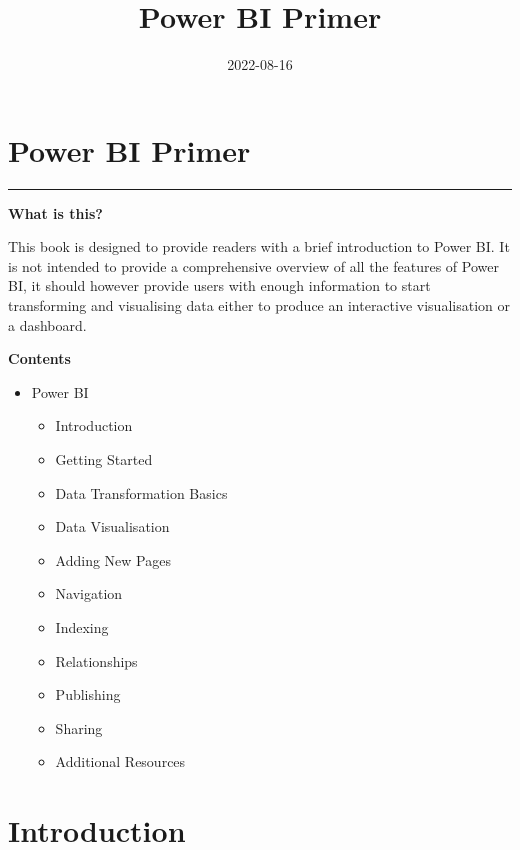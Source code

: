 \documentclass[
]{book}
\title{Power BI Primer}
\author{}
\date{\vspace{-2.5em}2022-08-16}
\providecommand{\tightlist}{%
  \setlength{\itemsep}{0pt}\setlength{\parskip}{0pt}}
\begin{document}
\maketitle

{
\setcounter{tocdepth}{1}
\tableofcontents
}
\hypertarget{Power-BI-Primer}{%
\chapter*{Power BI Primer}\label{Power-BI-Primer}}

\begin{center}\rule{0.5\linewidth}{0.5pt}\end{center}

\textbf{What is this?}

This book is designed to provide readers with a brief introduction to Power BI. It is not intended to provide a comprehensive overview of all the features of Power BI, it should however provide users with enough information to start transforming and visualising data either to produce an interactive visualisation or a dashboard.

\textbf{Contents}

\begin{itemize}
\tightlist
\item
  Power BI

  \begin{itemize}
  \tightlist
  \item
    Introduction
  \item
    Getting Started
  \item
    Data Transformation Basics
  \item
    Data Visualisation
  \item
    Adding New Pages
  \item
    Navigation
  \item
    Indexing
  \item
    Relationships
  \item
    Publishing
  \item
    Sharing
  \item
    Additional Resources
  \end{itemize}
\end{itemize}

\hypertarget{intro}{%
\chapter{Introduction}\label{intro}}
\end{document}
